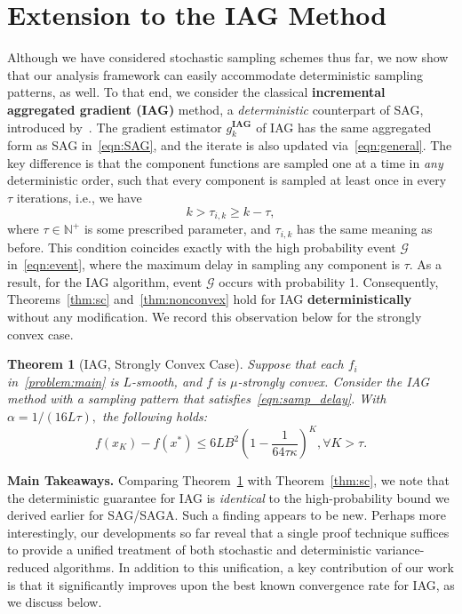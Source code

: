 \documentclass{article}
\theoremstyle{plain}
\newtheorem{theorem}{Theorem}[section]
\theoremstyle{definition}
\newcommand{\N}{\mathbb{N}}
\newcommand{\cG}{\mathcal{G}}
\newcommand{\paren}[1]{\left( #1\right)}
\begin{document}
\section{Extension to the IAG Method}

\label{sec:IAG}
Although we have considered stochastic sampling schemes thus far, we now show that our analysis framework can easily accommodate deterministic sampling patterns, as well. To that end, we consider the classical \textbf{incremental aggregated gradient (IAG)} method, a \textit{deterministic} counterpart of SAG, introduced by~\citet{blatt2007convergent}. The gradient estimator $g_k^\textbf{IAG}$ of IAG has the same aggregated form as SAG in~\eqref{eqn:SAG}, and the iterate is also updated via~\eqref{eqn:general}. The key difference is that the component functions are sampled one at a time in \textit{any} deterministic order, such that every component is sampled at least once in every $\tau$ iterations, i.e., we have  
\begin{equation}
    k>\tau_{i, k} \geq k-\tau,
\label{eqn:samp_delay}
\end{equation}
where $\tau\in\N^+$ is some prescribed parameter, and $\tau_{i,k}$ has the same meaning as before. This condition coincides exactly with the high probability event $\cG$ in~\eqref{eqn:event}, where the maximum delay in sampling any component is $\tau$. As a result, for the IAG algorithm, event $\cG$ occurs with probability 1. Consequently, Theorems~\ref{thm:sc} and~\ref{thm:nonconvex} hold for IAG \textbf{deterministically} without any modification. We record this observation below for the strongly convex case. 

\begin{theorem}[IAG, Strongly Convex Case]\label{thm:sc_iag}
Suppose that each $f_i$ in~\eqref{problem:main} is $L$-smooth, and $f$ is $\mu$-strongly convex. Consider the IAG method with a sampling pattern that satisfies~\eqref{eqn:samp_delay}. With $\alpha = 1/(16 L \tau),$ the following holds:
\begin{equation}
    f(x_K) - f(x^*)\leq 6LB^2\paren{1-\frac{1}{64\tau\kappa}}^{K}, \forall K > \tau.\label{eqn:sc_iag}
\end{equation}
\end{theorem}

\textbf{Main Takeaways.} Comparing Theorem~\ref{thm:sc_iag} with Theorem~\ref{thm:sc}, we note that the deterministic guarantee for IAG is \emph{identical} to the high-probability bound we derived earlier for SAG/SAGA. Such a finding appears to be new. Perhaps more interestingly, our developments so far reveal that a single proof technique suffices to provide a unified treatment of both stochastic and deterministic variance-reduced algorithms. In addition to this unification, a key contribution of our work is that it significantly improves upon the best known convergence rate for IAG, as we discuss below. 
\end{document}
